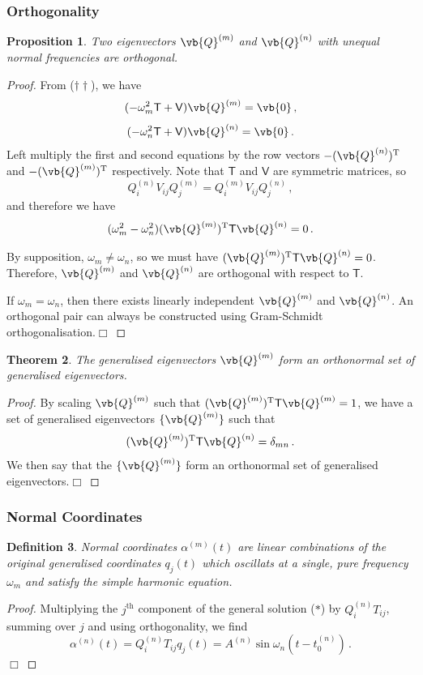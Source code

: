 \documentclass{article}
\theoremstyle{plain}\theoremheaderfont{\normalfont\itshape}\theorembodyfont{\rmfamily}\theoremseparator{.}\newtheorem*{rem}{Remark}\newtheorem*{ex}{Example}\newtheorem*{proof}{Proof}\newtheorem*{altp}{Alternative proof}
\theoremstyle{plain}\theoremheaderfont{\normalfont\bfseries}\theorembodyfont{\rmfamily}\theoremseparator{.}\newtheorem{thm}{Theorem}[section]\newtheorem{lem}[thm]{Lemma}\newtheorem{prop}[thm]{Proposition}\newtheorem*{cor}{Corollary}\newtheorem{defn}[thm]{Definition}\newtheorem{clm}[thm]{Claim}\newtheorem{clminproof}{Claim}
\theoremstyle{break}\theoremheaderfont{\normalfont\itshape}\theorembodyfont{\rmfamily}\theoremseparator{.\medskip}\newtheorem*{proofskip}{Proof}\newtheorem*{exs}{Examples}\newtheorem*{rems}{Remarks}
\theoremstyle{break}\theoremheaderfont{\normalfont\bfseries}\theorembodyfont{\rmfamily}\theoremseparator{.\medskip}\newtheorem{lemskip}[thm]{Lemma}\newtheorem{defnskip}[thm]{Definition}\newtheorem{propskip}[thm]{Proposition}\newtheorem{thmskip}[thm]{Theorem}
\numberwithin{equation}{section}
\newcommand{\qed}{\hfill\ensuremath{\Box}}
\newcommand{\tp}{^\mathrm{T}}
\begin{document}
	\subsubsection{Orthogonality}
	\begin{prop}
		Two eigenvectors \(\vb{Q}^{(m)}\) and \(\vb{Q}^{(n)}\) with unequal normal frequencies are orthogonal.
	\end{prop}
	\begin{proof}
		From (\(\dagger\dagger\)), we have
		\[(-\omega_m^2\mathsf{T}+\mathsf{V})\vb{Q}^{(m)}=\vb{0}\,,\]
		\[(-\omega_n^2\mathsf{T}+\mathsf{V})\vb{Q}^{(n)}=\vb{0}\,.\]
		Left multiply the first and second equations by the row vectors \(-(\vb{Q}^{(n)})\tp\) and \(-(\vb{Q}^{(m)})\tp\) respectively. Note that \(\mathsf{T}\) and \(\mathsf{V}\) are symmetric matrices, so
		\[Q_i^{(n)}V_{ij}Q_j^{(m)}=Q_i^{(m)}V_{ij}Q_j^{(n)}\,,\]
		and therefore we have
		\[(\omega_m^2-\omega_n^2)(\vb{Q}^{(m)})\tp\mathsf{T}\vb{Q}^{(n)}=0\,.\]

		By supposition, \(\omega_m\ne\omega_n\), so we must have \((\vb{Q}^{(m)})\tp\mathsf{T}\vb{Q}^{(n)}=0\). Therefore, \(\vb{Q}^{(m)}\) and \(\vb{Q}^{(n)}\) are orthogonal with respect to \(\mathsf{T}\).

		If \(\omega_m=\omega_n\), then there exists linearly independent \(\vb{Q}^{(m)}\) and \(\vb{Q}^{(n)}\). An orthogonal pair can always be constructed using Gram-Schmidt orthogonalisation.\qed
	\end{proof}

	\begin{thm}
		The generalised eigenvectors \(\vb{Q}^{(m)}\) form an orthonormal set of generalised eigenvectors.
	\end{thm}
	\begin{proof}
		By scaling \(\vb{Q}^{(m)}\) such that \((\vb{Q}^{(m)})\tp\mathsf{T}\vb{Q}^{(m)}=1\), we have a set of generalised eigenvectors \(\{\vb{Q}^{(m)}\}\) such that
		\[(\vb{Q}^{(m)})\tp\mathsf{T}\vb{Q}^{(n)}=\delta_{mn}\,.\]
		We then say that the \(\{\vb{Q}^{(m)}\}\) form an orthonormal set of generalised eigenvectors.\qed
	\end{proof}
	\subsubsection{Normal Coordinates}
	\begin{defn}
		\textit{Normal coordinates} \(\alpha^{(m)}(t)\) are linear combinations of the original generalised coordinates \(q_j(t)\) which oscillats at a single, pure frequency \(\omega_m\) and satisfy the simple harmonic equation.
	\end{defn}
	\begin{prop}\label[prop]{normco}
		The normal coordinates are given by
		\[\alpha^{(n)}(t)=Q_{i}^{(n)}T_{ij}q_j(t)\,.\]
	\end{prop}
	\begin{proof}
		Multiplying the \(j^\text{th}\) component of the general solution (\(*\)) by \(Q_{i}^{(n)}T_{ij}\), summing over \(j\) and using orthogonality, we find
		\[\alpha^{(n)}(t)=Q_{i}^{(n)}T_{ij}q_j(t)=A^{(n)}\sin\omega_n(t-t_0^{(n)})\,.\]\qed
	\end{proof}
\end{document}
